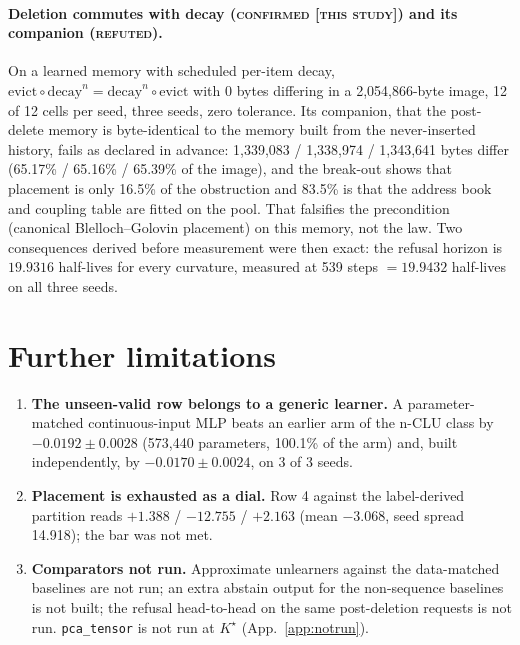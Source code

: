 \documentclass{article} %
\newcommand{\Kstar}{\ensuremath{K^{\star}}}
\begin{document}
\paragraph{Deletion commutes with decay (\textsc{confirmed [this study]}) and its companion
(\textsc{refuted}).} On a learned memory with scheduled per-item decay,
$\text{evict}\circ\text{decay}^n=\text{decay}^n\circ\text{evict}$ with 0 bytes differing in a
2,054,866-byte image, 12 of 12 cells per seed, three seeds, zero tolerance.
Its companion, that the post-delete memory is byte-identical to the memory built from the
never-inserted history, fails as declared in advance: 1,339,083 / 1,338,974 / 1,343,641 bytes differ
(65.17\% / 65.16\% / 65.39\% of the image), and the break-out shows that placement is only 16.5\%
of the obstruction and 83.5\% is that the address book and coupling table are fitted on the pool.
That falsifies the precondition (canonical Blelloch--Golovin placement) on this memory, not the
law. Two consequences derived before measurement were then exact: the refusal horizon is $19.9316$
half-lives for every curvature, measured at 539 steps $=19.9432$ half-lives on all three seeds.


\section{Further limitations}
\label{app:morelimits}
\begin{enumerate}
\item \textbf{The unseen-valid row belongs to a generic learner.} A parameter-matched
  continuous-input MLP beats an earlier arm of the n-CLU class by $-0.0192\pm0.0028$ (573,440
  parameters, 100.1\% of the arm) and, built independently, by $-0.0170\pm0.0024$, on 3 of 3
  seeds. %
\item \textbf{Placement is exhausted as a dial.} Row 4 against the label-derived partition reads
  $+1.388$ / $-12.755$ / $+2.163$ (mean $-3.068$, seed spread 14.918); the bar was not met.
\item \textbf{Comparators not run.} Approximate unlearners against the data-matched baselines are not
  run; an extra abstain output for the non-sequence baselines is not built; the refusal head-to-head on
  the same post-deletion requests is not run. \texttt{pca\_tensor} is not run at $\Kstar$
  (App.~\ref{app:notrun}).
\end{enumerate}
\end{document}
